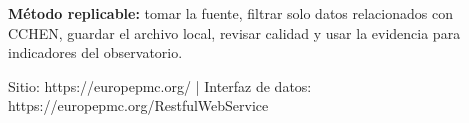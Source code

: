 \documentclass[9pt,a4paper]{extarticle}
\begin{document}
\vspace{0.06cm}
\begin{tcolorbox}[enhanced,colback=white,colframe=cchenpurple!55,boxrule=0.45pt,arc=2pt,left=6pt,right=6pt,top=5pt,bottom=5pt]
{\bfseries\color{cchenpurple}Método replicable:} tomar la fuente, filtrar solo datos relacionados con CCHEN, guardar el archivo local, revisar calidad y usar la evidencia para indicadores del observatorio.
\end{tcolorbox}

\vspace{0.02cm}
{\scriptsize\color{mutedgray}Sitio: https://europepmc.org/ \quad | \quad Interfaz de datos: https://europepmc.org/RestfulWebService}
\end{document}
